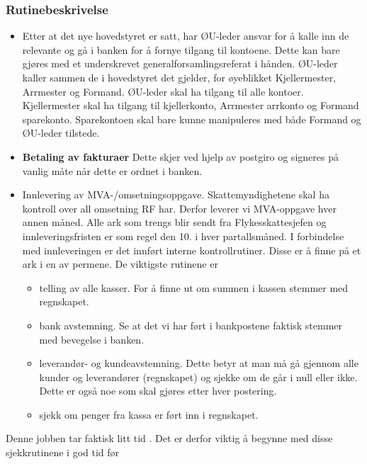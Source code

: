 \subsubsection{Rutinebeskrivelse}

\begin{itemize}

\item{} Etter at det nye hovedstyret er satt, har ØU-leder ansvar for å kalle inn de
  relevante og gå i banken for å fornye tilgang til kontoene. Dette
  kan bare gjøres med et underskrevet generalforsamlingsreferat i
  hånden. ØU-leder kaller sammen de i hovedstyret det gjelder, for
  øyeblikket Kjellermester, Arrmester og Formand. ØU-leder skal ha
  tilgang til alle kontoer. Kjellermester skal ha tilgang til
  kjellerkonto, Arrmester arrkonto og Formand sparekonto. Sparekontoen
  skal bare kunne manipuleres med både Formand og ØU-leder tilstede.

\item{} \textbf{Betaling av fakturaer} Dette skjer ved hjelp av
  postgiro og signeres på vanlig måte når dette er ordnet i banken.

\item{} Innlevering av MVA-/omsetningsoppgave. Skattemyndighetene skal ha kontroll
  over all omsetning RF har. Derfor leverer vi MVA-oppgave hver annen
  måned. Alle ark som trengs blir sendt fra Flykesskattesjefen og
  innleveringsfristen er som regel den 10. i hver partallsmåned. I
  forbindelse med innleveringen er det innført interne
  kontrollrutiner. Disse er å finne på et ark i en av
  permene. De viktigste rutinene er
  \begin{itemize}
  \item{}telling av alle kasser. For å finne ut om summen i kassen
    stemmer med regnskapet.
  \item{}bank avstemning. Se at det vi har ført i bankpostene faktisk
    stemmer med bevegelse i banken.
  \item{}leverandør- og kundeavstemning. Dette betyr at man må gå
    gjennom alle kunder og leverandører (regnskapet) og sjekke om de går i null
    eller ikke. Dette er også noe som skal gjøres etter hver
    postering.
  \item{}sjekk om penger fra kassa er ført inn i regnskapet.
  \end{itemize}
\end{itemize}
Denne jobben tar faktisk litt tid . Det er derfor viktig
å begynne med disse sjekkrutinene i god tid før
